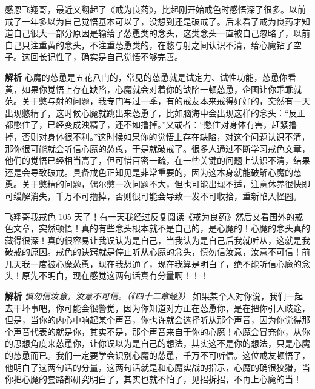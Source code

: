 \begin{case}[必须完善你的觉悟]
    感恩飞翔哥，最近又翻起了《戒为良药》，比起刚开始戒色时感悟深了很多。以前戒了一年多以为自己觉悟基本可以了，没想到还是破戒了。后来看了戒为良药才知道自己很大一部分原因是输给了怂恿类的念头，这类念头一直被自己忽略了，以前自己只注重黄的念头，不注重怂恿类的，在憋与射之间认识不清，给心魔钻了空子。这回长记性了，确实是自己觉悟不够完善。

    \textbf{解析} 心魔的怂恿是五花八门的，常见的怂恿就是试定力、试性功能，怂恿你看黄，如果你觉悟上存在缺陷，心魔就会对着你的缺陷一顿怂恿，企图让你乖乖就范。关于憋与射的问题，我专门写过一季，有的戒友本来戒得好好的，突然有一天出现憋精了，这时候心魔就跳出来怂恿了，比如脑海中会出现这样的念头：“反正都憋住了，已经变成浊精了，还不如撸掉。”又或者：“憋住对身体有害，赶紧撸掉，否则对身体很不利。”这时候如果你的觉悟上存在缺陷，对这个问题认识不清，那你很可能就会听信心魔的怂恿，于是就破戒了。很多人通过不断学习戒色文章，他们的觉悟已经相当高了，但可惜百密一疏，在一些关键的问题上认识不清，结果还是会导致破戒。具备戒色正知见是非常重要的，因为这本身就能破解心魔的怂恿。关于憋精的问题，偶尔憋一次问题不大，但也可能出现不适，注意休养很快即可缓解消失，千万不可撸掉，否则很可能会导致一发不可收拾，重新陷入怪圈。
\end{case}

\begin{case}
    飞翔哥我戒色 105 天了！有一天我经过反复阅读《戒为良药》然后又看国外的戒色文章，突然顿悟！真的有些念头根本就不是自己的，是心魔的！心魔的念头真的藏得很深！真的很容易让我误认为是自己，当我认为是自己后我就听从，这就是我破戒的原因。戒色的诀窍就是停止听从心魔的念头，慎勿信汝意，汝意不可信！前几天我一度被心魔怂恿，现在我想通了，现在我算是明白了，绝不能听信心魔的念头！原先不明白，现在感觉这两句话真有分量啊！！！

    \textbf{解析} \textit{慎勿信汝意，汝意不可信。（《四十二章经》）} 如果某个人对你说，我们一起去干坏事吧，你可能会很警觉，因为你知道对方正在怂恿你，是在把你引入歧途，但是，当你的内心中响起某个声音，你也许就会选择听从那个声音，因为你觉得那个声音代表的就是你，其实不是，那个声音来自于你的心魔！心魔会冒充你，从你的思想角度来怂恿你，让你误以为是自己的想法，其实这不是你的想法，只是心魔的怂恿而已。我们一定要学会识别心魔的怂恿，千万不可听信。这位戒友顿悟了，他明白了这两句话的分量，这两句话就是和心魔实战的指示，心魔的确很狡猾，当你把心魔的套路都研究明白了，其实也就不怕了，见招拆招，不再上心魔的当！
\end{case}

